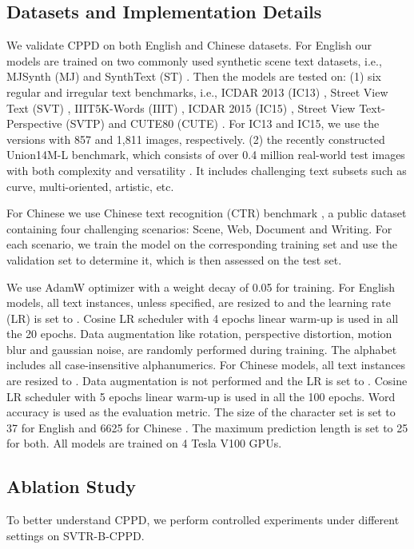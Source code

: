 \documentclass[10pt,journal,compsoc]{IEEEtran}
\begin{document}
\subsection{Datasets and Implementation Details}
We validate CPPD on both English and Chinese datasets. For English our models are trained on two commonly used synthetic scene text datasets, i.e., MJSynth (MJ) \cite{jaderberg14synthetic, Jader2015Reading} and SynthText (ST) \cite{Synthetic}. Then the models are tested on: (1) six regular and irregular text benchmarks, i.e., ICDAR 2013 (IC13) \cite{icdar2013}, Street View Text (SVT) \cite{Wang2011SVT}, IIIT5K-Words (IIIT) \cite{IIIT5K}, ICDAR 2015 (IC15) \cite{icdar2015}, Street View Text-Perspective (SVTP) \cite{SVTP} and CUTE80 (CUTE) \cite{Risnumawan2014cute}. For IC13 and IC15, we use the versions with 857 and 1,811 images, respectively. (2) the recently constructed Union14M-L benchmark, which consists of over 0.4 million real-world test images with both complexity and versatility \cite{jiang2023revisiting}. It includes challenging text subsets such as curve, multi-oriented, artistic, etc. 

For Chinese we use Chinese text recognition (CTR) benchmark \cite{chen2021benchmarking}, a public dataset containing four challenging scenarios: Scene, Web, Document and Writing. For each scenario, we train the model on the corresponding training set and use the validation set to determine it, which is then assessed on the test set.


We use AdamW optimizer \cite{adamw} with a weight decay of 0.05 for training. For English models, all text instances, unless specified, are resized to  and the learning rate (LR) is set to . Cosine LR scheduler \cite{cosine} with 4 epochs linear warm-up is used in all the 20 epochs. 
Data augmentation like rotation, perspective distortion, motion blur and gaussian noise, are randomly performed during training. The alphabet includes all case-insensitive alphanumerics. For Chinese models, all text instances are resized to . Data augmentation is not performed and the LR is set to . Cosine LR scheduler with 5 epochs linear warm-up is used in all the 100 epochs. Word accuracy is used as the evaluation metric. The size of the character set  is set to 37 for English and 6625 for Chinese \cite{ppocrv3}. The maximum prediction length  is set to 25 for both. All models are trained on 4 Tesla V100 GPUs.


\subsection{Ablation Study} \label{section:3.3}
To better understand CPPD, we perform controlled experiments under different settings on SVTR-B-CPPD.
\end{document}
